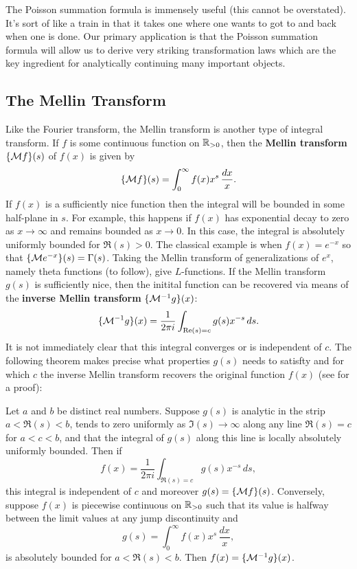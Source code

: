         The Poisson summation formula is immensely useful (this cannot be overstated). It's sort of like a train in that it takes one where one wants to got to and back when one is done. Our primary application is that the Poisson summation formula will allow us to derive very striking transformation laws which are the key ingredient for analytically continuing many important objects.
      \subsection*{The Mellin Transform}
        Like the Fourier transform, the Mellin transform is another type of integral transform. If $f$ is some continuous function on $\mathbb{R}_{>0}$, then the \textbf{Mellin transform} $\{\mathcal{M}f\}(s)$ of $f(x)$ is given by
        \[
          \{\mathcal{M}f\}(s) = \int_{0}^{\infty}f(x)x^{s}\,\frac{dx}{x}.
        \]
        If $f(x)$ is a sufficiently nice function then the integral will be bounded in some half-plane in $s$. For example, this happens if $f(x)$ has exponential decay to zero as $x \to \infty$ and remains bounded as $x \to 0$. In this case, the integral is absolutely uniformly bounded for $\Re(s) > 0$. The classical example is when $f(x) = e^{-x}$ so that $\{\mathcal{M}e^{-x}\}(s) = \Gamma(s)$. Taking the Mellin transform of generalizations of $e^{x}$, namely theta functions (to follow), give $L$-functions. If the Mellin transform $g(s)$ is sufficiently nice, then the initital function can be recovered via means of the \textbf{inverse Mellin transform} $\{\mathcal{M}^{-1}g\}(x)$:
        \[
          \{\mathcal{M}^{-1}g\}(x) = \frac{1}{2\pi i}\int_{\mathrm{Re}(s) = c}g(s)x^{-s}\,ds.
        \]
        It is not immediately clear that this integral converges or is independent of $c$. The following theorem makes precise what properties $g(s)$ needs to satisfty and for which $c$ the inverse Mellin transform recovers the original function $f(x)$ (see \cite{debnath2002integral} for a proof):

        \begin{theorem}
          Let $a$ and $b$ be distinct real numbers. Suppose $g(s)$ is analytic in the strip $a < \Re(s) < b$, tends to zero uniformly as $\Im(s) \to \infty$ along any line $\Re(s) = c$ for $a < c < b$, and that the integral of $g(s)$ along this line is locally absolutely uniformly bounded. Then if
          \[
            f(x) = \frac{1}{2\pi i}\int_{\Re(s) = c}g(s)x^{-s}\,ds,
          \]
          this integral is independent of $c$ and moreover $g(s) = \{\mathcal{M}f\}(s)$. Conversely, suppose $f(x)$ is piecewise continuous on $\mathbb{R}_{>0}$ such that its value is halfway between the limit values at any jump discontinuity and
          \[
            g(s) = \int_{0}^{\infty}f(x)x^{s}\,\frac{dx}{x},
          \]
          is absolutely bounded for $a < \Re(s) < b$. Then $f(x) = \{\mathcal{M}^{-1}g\}(x)$.
        \end{theorem}
